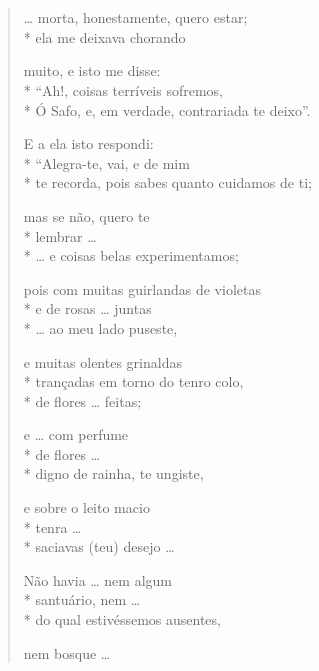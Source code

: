 \section*{}
\begin{verse}
\ldots{} morta, honestamente, quero estar;\\*
ela me deixava chorando

muito, e isto me disse:\\*
“Ah!, coisas terríveis sofremos,\\*
Ó Safo, e, em verdade, contrariada te deixo”.

E a ela isto respondi:\\*
“Alegra-te, vai, e de mim\\*
te recorda, pois sabes quanto cuidamos de ti;

mas se não, quero te\\*
lembrar \ldots{}\\*
\ldots{} e coisas belas experimentamos;

pois com muitas guirlandas de violetas\\*
e de rosas \ldots{} juntas\\*
\ldots{} ao meu lado puseste,			

e muitas olentes grinaldas\\*
trançadas em torno do tenro colo, \\*
de flores \ldots{} feitas;

e \ldots{} com perfume\\*
de flores \ldots{}\\*
digno de rainha, te ungiste,

e sobre o leito macio\\*
tenra \ldots{}\\*
saciavas (teu) desejo \ldots{}

Não havia \ldots{} nem algum\\*
santuário, nem \ldots{}\\*
do qual estivéssemos ausentes,

nem bosque \ldots{}
\end{verse}

